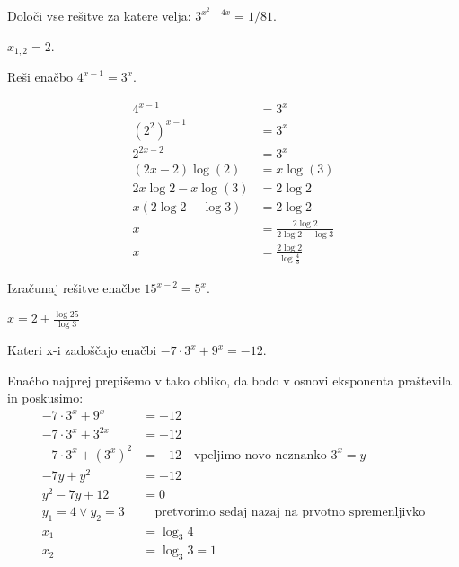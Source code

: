 \begin{vaja}
	Določi vse rešitve za katere velja: \(3^{x^2-4x}=1/81\).
  \begin{odgovor}$x_{1,2}=2$.
  \end{odgovor}
\end{vaja}


\begin{vaja}
  Reši enačbo $4^{x-1}=3^x$.

  \begin{odgovor}
	\begin{align*}
	 4^{x-1}&=3^x\\
	 (2^2)^{x-1}&=3^x\\
	 2^{2x-2}&=3^x\\
	 (2x-2)\log(2)&=x\log(3)\\
	 2x\log2-x\log(3)&=2\log2\\
	 x(2\log2-\log3)&=2\log2\\
	 x&=\frac{2\log2}{2\log2-\log3}\\
	 x&=\frac{2\log2}{\log{\frac{4}{3}}}
	\end{align*}    
  \end{odgovor}
\end{vaja}

\begin{vaja}
	Izračunaj rešitve enačbe \( 15^{x-2}=5^x\).
  \begin{odgovor}
   	$x=2+\frac{\log25}{\log3}$
  \end{odgovor}
\end{vaja}

\begin{vaja}
	Kateri x-i zadoščajo enačbi \(-7\cdot 3^x+9^x=-12\).
  \begin{odgovor}
   	Enačbo najprej prepišemo v tako obliko, da bodo v osnovi eksponenta praštevila in poskusimo:
	\begin{align*}
	-7 \cdot 3^x+9^x&=-12\\
	-7\cdot 3^x+3^{2x}&=-12\\
	-7\cdot 3^x+(3^x)^2&=-12\quad \text{vpeljimo novo neznanko } 3^x=y\\
	-7y+y^2&=-12\\
	y^2-7y+12&=0\\
	y_{1}=4 \lor y_{2}=3 & \quad \text{pretvorimo sedaj nazaj na prvotno spremenljivko}\\
	x_{1}&=\log_{3}{4}\\
	x_{2}&=\log_{3}{3}=1
	\end{align*}
  \end{odgovor}
\end{vaja}

